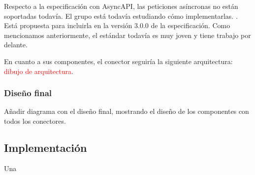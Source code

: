 Respecto a la especificación con AsyncAPI, las peticiones asíncronas no están soportadas todavía. El grupo está todavía estudiando cómo implementarlas. . Está propuesta para incluirla en la versión 3.0.0 de la especificación. Como mencionamos anteriormente, el estándar todavía es muy joven y tiene trabajo por delante.

En cuanto a sus componentes, el conector seguiría la siguiente arquitectura: \textcolor{red}{dibujo de arquitectura}.

\subsubsection{Diseño final}

Añadir diagrama con el diseño final, mostrando el diseño de los componentes con todos los conectores.

\subsection{Implementación}

Una
